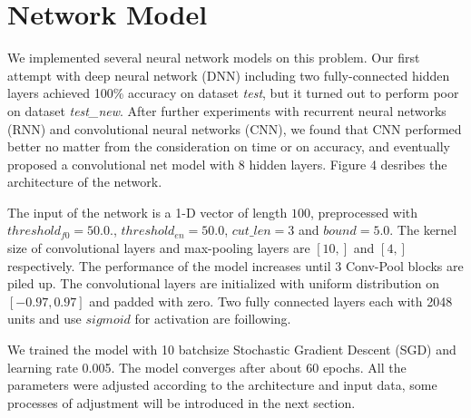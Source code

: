 \documentclass[a4paper, 11pt]{article} %
\begin{document}
\section{Network Model}
We implemented several neural network models on this problem. Our first attempt with deep neural network (DNN) including two fully-connected hidden layers achieved 100\% accuracy on dataset \textit{test}, but it turned out to perform poor on dataset \textit{test\_new}. After further experiments with recurrent neural networks (RNN)\cite{goller1996learning} and convolutional neural networks (CNN), we found that CNN performed better no matter from the consideration on time or on accuracy, and eventually proposed a convolutional net model with 8 hidden layers. Figure 4 desribes the architecture of the network.
\par
The input of the network is a 1-D vector of length $100$, preprocessed with $threshold_{f0} = 50.0$., $threshold_{en} = 50.0$, $cut\_len = 3$ and $bound = 5.0$. The kernel size of convolutional layers and max-pooling layers are $[10,]$ and $[4,]$ respectively. The performance of the model increases until 3 Conv-Pool blocks are piled up. The convolutional layers are initialized with uniform distribution on $[-0.97, 0.97]$ and padded with zero. Two fully connected layers each with 2048 units and use $sigmoid$ for activation are foillowing.
\par
We trained the model with 10 batchsize Stochastic Gradient Descent (SGD)\cite{lecun1989backpropagation} and learning rate 0.005. The model converges after about 60 epochs. All the parameters were adjusted according to the architecture and input data, some processes of adjustment will be introduced in the next section.
\end{document}
